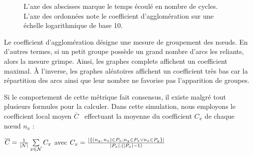 \begin{figure}
  \centering
  \hspace{10pt}
  \caption[Coefficient d'agglomération]{\label{net:fig:clustering}L'axe des
    abscisses marque le temps écoulé en nombre de cycles. L'axe des ordonnées
    note le coefficient d'agglomération sur une échelle logarithmique de base
    10.}
\end{figure}

Le coefficient d'agglomération désigne une mesure de groupement des nœuds. En
d'autres termes, si un petit groupe possède un grand nombre d'arcs les reliants,
alors la mesure grimpe. Ainsi, les graphes complets affichent un coefficient
maximal. À l'inverse, les graphes aléatoires affichent un coefficient très bas
car la répartition des arcs ainsi que leur nombre ne favorise pas l'apparition
de groupes.

Si le comportement de cette métrique fait consensus, il existe malgré tout
plusieurs formules pour la calculer. Dans cette simulation, nous employons le
coefficient local moyen $\overline{C}$~\cite{watts1998collective} effectuant la
moyenne du coefficient $C_x$ de chaque nœud $n_x$ :
\begin{center}
  $\overline{C} = {1\over |\mathcal{N}|}\sum\limits_{x\in\mathcal{N}}C_x$ \hfill
  avec
  $C_x = {|\{ (n_y,\,n_z) \in P_x, n_y \in P_z \vee n_z \in P_y \}|\over
    |P_x|.(|P_x|-1)}$
\end{center}

